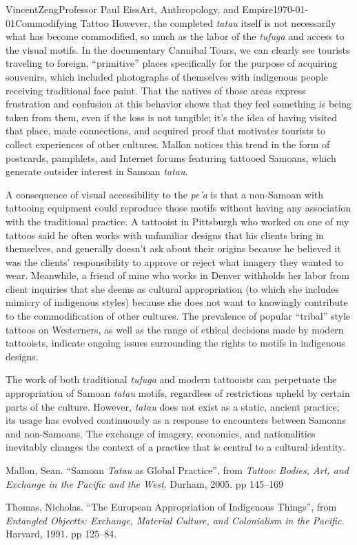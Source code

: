 \documentclass[12pt]{article}
\begin{document}
\begin{mla}{Vincent}{Zeng}{Professor Paul Eiss}{Art, Anthropology, and
  Empire}{\today}{Commodifying Tattoo}
However, the completed \textit{tatau} itself is not necessarily what has become
commodified, so much as the labor of the \textit{tufuga} and access to the
visual motifs. In the documentary Cannibal Tours, we can clearly see tourists
traveling to foreign, ``primitive'' places specifically for the purpose of
acquiring souvenirs, which included photographs of themselves with indigenous
people receiving traditional face paint. That the natives of those areas express
frustration and confusion at this behavior shows that they feel something is
being taken from them, even if the loss is not tangible; it's the idea of having
visited that place, made connections, and acquired proof that motivates tourists
to collect experiences of other cultures. Mallon notices this trend in the form
of postcards, pamphlets, and Internet forums featuring tattooed Samoans, which
generate outsider interest in Samoan \textit{tatau}.

A consequence of visual accessibility to the \textit{pe'a} is that a non-Samoan
with tattooing equipment could reproduce those motifs without having any
association with the traditional practice. A tattooist in Pittsburgh who worked
on one of my tattoos said he often works with unfamiliar designs that his
clients bring in themselves, and generally doesn't ask about their origins
because he believed it was the clients' responsibility to approve or reject what
imagery they wanted to wear. Meanwhile, a friend of mine who works in Denver
withholds her labor from client inquiries that she deems as cultural
appropriation (to which she includes mimicry of indigenous styles) because she
does not want to knowingly contribute to the commodification of other cultures.
The prevalence of popular ``tribal'' style tattoos on Westerners, as well as the
range of ethical decisions made by modern tattooists, indicate ongoing issues
surrounding the rights to motifs in indigenous designs.

The work of both traditional \textit{tufuga} and modern tattooists can
perpetuate the appropriation of Samoan \textit{tatau} motifs, regardless of
restrictions upheld by certain parts of the culture. However, \textit{tatau}
does not exist as a static, ancient practice; its usage has evolved continuously
as a response to encounters between Samoans and non-Samoans. The exchange of
imagery, economics, and nationalities inevitably changes the context of a
practice that is central to a cultural identity.

\begin{workscited}
  \bibent
  Mallon, Sean. ``Samoan \textit{Tatau} as Global Practice'', from
  \textit{Tattoo: Bodies, Art, and Exchange in the Pacific and the West}.
  Durham, 2005. pp 145--169

  \bibent
  Thomas, Nicholas. ``The European Appropriation of Indigenous Things'', from
  \textit{Entangled Objectts: Exchange, Material Culture, and Colonialism in the
  Pacific}. Harvard, 1991. pp 125--84.

\end{workscited}
\end{mla}
\end{document}
